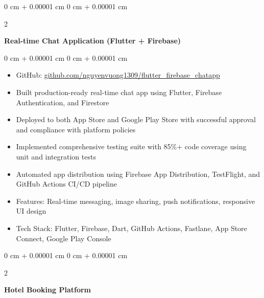 \documentclass[10pt, letterpaper]{article}
\newenvironment{highlights}{
    \begin{itemize}[
        topsep=0.10 cm,
        parsep=0.10 cm,
        partopsep=0pt,
        itemsep=0pt,
        leftmargin=0 cm + 10pt
    ]
}{
    \end{itemize}
} %
\newenvironment{onecolentry}{
    \begin{adjustwidth}{
        0 cm + 0.00001 cm
    }{
        0 cm + 0.00001 cm
    }
}{
    \end{adjustwidth}
} %
\newenvironment{twocolentry}[2][]{
    \onecolentry
    \def\secondColumn{#2}
    \setcolumnwidth{\fill, 4.5 cm}
    \begin{paracol}{2}
}{
    \switchcolumn \raggedleft \secondColumn
    \end{paracol}
    \endonecolentry
} %
\begin{document}
        \vspace{0.2 cm}

        \begin{twocolentry}{
            2024
        }
            \textbf{Real-time Chat Application (Flutter + Firebase)}
        \end{twocolentry}

        \vspace{0.15 cm}
        \begin{onecolentry}
            \begin{highlights}
                \item GitHub: \href{https://github.com/nguyenvuong1309/flutter_firebase_chatapp}{github.com/nguyenvuong1309/flutter\_firebase\_chatapp}
                \item Built production-ready real-time chat app using Flutter, Firebase Authentication, and Firestore
                \item Deployed to both App Store and Google Play Store with successful approval and compliance with platform policies
                \item Implemented comprehensive testing suite with 85\%+ code coverage using unit and integration tests
                \item Automated app distribution using Firebase App Distribution, TestFlight, and GitHub Actions CI/CD pipeline
                \item Features: Real-time messaging, image sharing, push notifications, responsive UI design
                \item Tech Stack: Flutter, Firebase, Dart, GitHub Actions, Fastlane, App Store Connect, Google Play Console
            \end{highlights}
        \end{onecolentry}

        \vspace{0.2 cm}

        \begin{twocolentry}{
            2023
        }
            \textbf{Hotel Booking Platform}
        \end{twocolentry}
\end{document}
